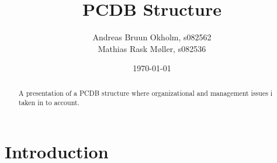 \documentclass[aip,amsmath,reprint, author-year]{revtex4-1}
\begin{document}
\begin{abstract}
A presentation of a PCDB structure where organizational and management issues i taken in to account.
\end{abstract}

\title{PCDB Structure}
\author{Andreas Bruun Okholm, s082562\\
Mathias Rask Møller, s082536 }  
 
\date{\today}
\maketitle


\section{Introduction}
\end{document}
